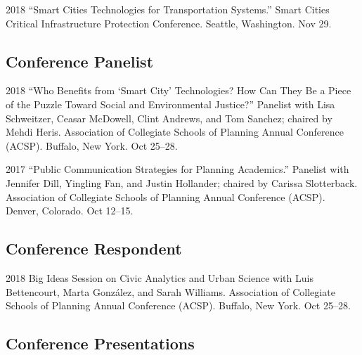 \documentclass[12pt,letterpaper]{report}
\begin{document}
	\begin{tablist}
		
		\item[2018] \tab \enquote{Smart Cities Technologies for Transportation Systems.} Smart Cities Critical Infrastructure Protection Conference. Seattle, Washington. Nov 29.
		
	\end{tablist}
	
	\subsection*{Conference Panelist}
	
	\begin{tablist}
		
		\item[2018] \tab \enquote{Who Benefits from \enquote{Smart City} Technologies? How Can They Be a Piece of the Puzzle Toward Social and Environmental Justice?} Panelist with Lisa Schweitzer, Ceasar McDowell, Clint Andrews, and Tom Sanchez; chaired by Mehdi Heris. Association of Collegiate Schools of Planning Annual Conference (ACSP). Buffalo, New York. Oct 25--28.
		
		\item[2017] \tab \enquote{Public Communication Strategies for Planning Academics.} Panelist with Jennifer Dill, Yingling Fan, and Justin Hollander; chaired by Carissa Slotterback. Association of Collegiate Schools of Planning Annual Conference (ACSP). Denver, Colorado. Oct 12--15.
		
	\end{tablist}
	
	\subsection*{Conference Respondent}
	
	\begin{tablist}
		
		\item[2018] \tab Big Ideas Session on Civic Analytics and Urban Science with Luis Bettencourt, Marta González, and Sarah Williams. Association of Collegiate Schools of Planning Annual Conference (ACSP). Buffalo, New York. Oct 25--28.
		
	\end{tablist}
	
	\subsection*{Conference Presentations}
	
\end{document}
